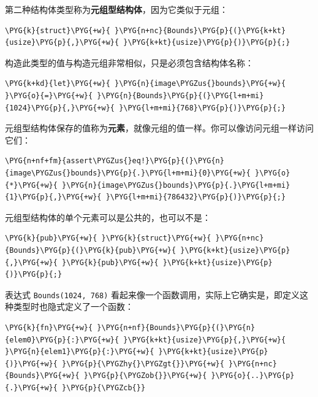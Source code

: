 第二种结构体类型称为\textbf{元组型结构体}，因为它类似于元组：

\begin{Verbatim}[commandchars=\\\{\},breaklines=true,breakanywhere=true,fontsize=\codefont,xleftmargin=17bp]
\PYG{k}{struct}\PYG{+w}{ }\PYG{n+nc}{Bounds}\PYG{p}{(}\PYG{k+kt}{usize}\PYG{p}{,}\PYG{+w}{ }\PYG{k+kt}{usize}\PYG{p}{)}\PYG{p}{;}
\end{Verbatim}

构造此类型的值与构造元组非常相似，只是必须包含结构体名称：

\begin{Verbatim}[commandchars=\\\{\},breaklines=true,breakanywhere=true,fontsize=\codefont,xleftmargin=17bp]
\PYG{k+kd}{let}\PYG{+w}{ }\PYG{n}{image\PYGZus{}bounds}\PYG{+w}{ }\PYG{o}{=}\PYG{+w}{ }\PYG{n}{Bounds}\PYG{p}{(}\PYG{l+m+mi}{1024}\PYG{p}{,}\PYG{+w}{ }\PYG{l+m+mi}{768}\PYG{p}{)}\PYG{p}{;}
\end{Verbatim}

元组型结构体保存的值称为\textbf{元素}，就像元组的值一样。你可以像访问元组一样访问它们：

\begin{Verbatim}[commandchars=\\\{\},breaklines=true,breakanywhere=true,fontsize=\codefont,xleftmargin=17bp]
\PYG{n+nf+fm}{assert\PYGZus{}eq!}\PYG{p}{(}\PYG{n}{image\PYGZus{}bounds}\PYG{p}{.}\PYG{l+m+mi}{0}\PYG{+w}{ }\PYG{o}{*}\PYG{+w}{ }\PYG{n}{image\PYGZus{}bounds}\PYG{p}{.}\PYG{l+m+mi}{1}\PYG{p}{,}\PYG{+w}{ }\PYG{l+m+mi}{786432}\PYG{p}{)}\PYG{p}{;}
\end{Verbatim}

元组型结构体的单个元素可以是公共的，也可以不是：

\begin{Verbatim}[commandchars=\\\{\},breaklines=true,breakanywhere=true,fontsize=\codefont,xleftmargin=17bp]
\PYG{k}{pub}\PYG{+w}{ }\PYG{k}{struct}\PYG{+w}{ }\PYG{n+nc}{Bounds}\PYG{p}{(}\PYG{k}{pub}\PYG{+w}{ }\PYG{k+kt}{usize}\PYG{p}{,}\PYG{+w}{ }\PYG{k}{pub}\PYG{+w}{ }\PYG{k+kt}{usize}\PYG{p}{)}\PYG{p}{;}
\end{Verbatim}

表达式 \texttt{Bounds(1024, 768)} 看起来像一个函数调用，实际上它确实是，即定义这种类型时也隐式定义了一个函数：

\begin{Verbatim}[commandchars=\\\{\},breaklines=true,breakanywhere=true,fontsize=\codefont,xleftmargin=17bp]
\PYG{k}{fn}\PYG{+w}{ }\PYG{n+nf}{Bounds}\PYG{p}{(}\PYG{n}{elem0}\PYG{p}{:}\PYG{+w}{ }\PYG{k+kt}{usize}\PYG{p}{,}\PYG{+w}{ }\PYG{n}{elem1}\PYG{p}{:}\PYG{+w}{ }\PYG{k+kt}{usize}\PYG{p}{)}\PYG{+w}{ }\PYG{p}{\PYGZhy{}\PYGZgt{}}\PYG{+w}{ }\PYG{n+nc}{Bounds}\PYG{+w}{ }\PYG{p}{\PYGZob{}}\PYG{+w}{ }\PYG{o}{..}\PYG{p}{.}\PYG{+w}{ }\PYG{p}{\PYGZcb{}}
\end{Verbatim}

